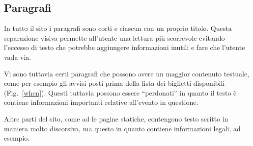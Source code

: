 \subsection{Paragrafi}
	In tutto il sito i paragrafi sono corti e ciascun con un proprio titolo.
	Questa separazione visiva permette all'utente una lettura più scorrevole evitando l'eccesso di testo che potrebbe aggiungere informazioni inutili e fare che l'utente vada via.
	\par Vi sono tuttavia certi paragrafi che possono avere un maggior contenuto testuale, come per esempio gli avvisi posti prima della lista dei biglietti disponibili (Fig.~\ref{when}).
	Questi tuttavia possono essere ``perdonati'' in quanto il testo è contiene informazioni importanti relative all'evento in questione.
	\par Altre parti del sito, come ad le pagine statiche, contengono testo scritto in maniera molto discorsiva, ma questo in quanto contiene informazioni legali, ad esempio.

